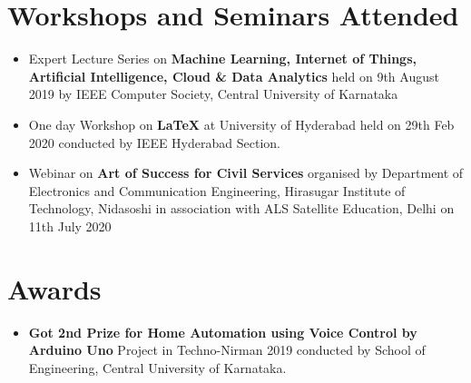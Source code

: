 \documentclass[]{article}
\begin{document}
    \section{Workshops and Seminars Attended}
    \begin{itemize}
        \item Expert Lecture Series on \textbf{Machine Learning, Internet of Things, Artificial Intelligence, Cloud \& Data Analytics}
        held on 9th August 2019 by IEEE Computer Society, Central University of Karnataka
        \item One day Workshop on \textbf{LaTeX} at University of Hyderabad held on 29th Feb 2020 conducted by IEEE Hyderabad Section.
        \item Webinar on \textbf{Art of Success for Civil Services} organised by Department of Electronics and Communication Engineering, Hirasugar Institute of Technology, Nidasoshi
         in association with ALS Satellite Education, Delhi on 11th July 2020
    \end{itemize}
    \section{Awards}
    \begin{itemize}
        \item \textbf{Got 2nd Prize for Home Automation using Voice Control by Arduino Uno} Project in Techno-Nirman 2019
        conducted by School of Engineering, Central University of Karnataka.
    \end{itemize}
    
    
\end{document}
